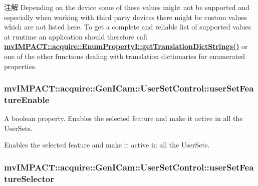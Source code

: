 \begin{DoxyNote}{注解}
Depending on the device some of these values might not be supported and especially when working with third party devices there might be custom values which are not listed here. To get a complete and reliable list of supported values at runtime an application should therefore call {\bfseries \hyperlink{classmv_i_m_p_a_c_t_1_1acquire_1_1_enum_property_i_a0ba6ccbf5ee69784d5d0b537924d26b6}{mv\+I\+M\+P\+A\+C\+T\+::acquire\+::\+Enum\+Property\+I\+::get\+Translation\+Dict\+Strings()}} or one of the other functions dealing with translation dictionaries for enumerated properties. 
\end{DoxyNote}
\hypertarget{classmv_i_m_p_a_c_t_1_1acquire_1_1_gen_i_cam_1_1_user_set_control_ab653f7510582633a32def34eafa21eab}{
\subsubsection[{user\+Set\+Feature\+Enable}]{ mv\+I\+M\+P\+A\+C\+T\+::acquire\+::\+Gen\+I\+Cam\+::\+User\+Set\+Control\+::user\+Set\+Feature\+Enable}}\label{classmv_i_m_p_a_c_t_1_1acquire_1_1_gen_i_cam_1_1_user_set_control_ab653f7510582633a32def34eafa21eab}


A boolean property. Enables the selected feature and make it active in all the User\+Sets. 

Enables the selected feature and make it active in all the User\+Sets. \hypertarget{classmv_i_m_p_a_c_t_1_1acquire_1_1_gen_i_cam_1_1_user_set_control_a0f8cbd4264279a3a748cd18a92a3efa8}{
\subsubsection[{user\+Set\+Feature\+Selector}]{ mv\+I\+M\+P\+A\+C\+T\+::acquire\+::\+Gen\+I\+Cam\+::\+User\+Set\+Control\+::user\+Set\+Feature\+Selector}}\label{classmv_i_m_p_a_c_t_1_1acquire_1_1_gen_i_cam_1_1_user_set_control_a0f8cbd4264279a3a748cd18a92a3efa8}


